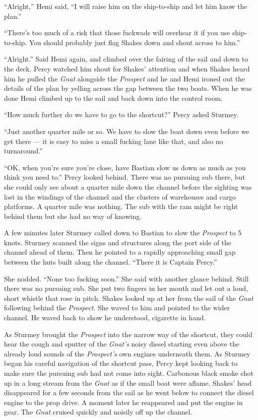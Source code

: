 \documentclass[]{scrbook}
\begin{document}
``Alright,'' Hemi said, ``I will raise him on the ship-to-ship and let
him know the plan.''

``There's too much of a risk that those fuckwads will overhear it if you
use ship-to-ship. You should probably just flag Shakes down and shout
across to him.''

``Alright.'' Said Hemi again, and climbed over the fairing of the sail
and down to the deck. Percy watched him shout for Shakes' attention and
when Shakes heard him he pulled the \emph{Gnat} alongside the
\emph{Prospect} and he and Hemi ironed out the details of the plan by
yelling across the gap between the two boats. When he was done Hemi
climbed up to the sail and back down into the control room.

``How much further do we have to go to the shortcut?'' Percy asked
Sturmey.

``Just another quarter mile or so. We have to slow the boat down even
before we get there --- it is easy to miss a small fucking lane like
that, and also no turnaround.''

``OK, when you're sure you're close, have Bastian slow us down as much
as you think you need to.'' Percy looked behind. There was no pursuing
sub there, but she could only see about a quarter mile down the channel
before the sighting was lost in the windings of the channel and the
clusters of warehouses and cargo platforms. A quarter mile was nothing.
The sub with the ram might be right behind them but she had no way of
knowing.

A few minutes later Sturmey called down to Bastian to slow the
\emph{Prospect} to 5 knots. Sturmey scanned the signs and structures
along the port side of the channel ahead of them. Then he pointed to a
rapidly approaching small gap between the huts built along the channel.
``There it is Captain Percy.''

She nodded. ``None too fucking soon.'' She said with another glance
behind. Still there was no pursuing sub. She put two fingers in her
mouth and let out a loud, short whistle that rose in pitch. Shakes
looked up at her from the sail of the \emph{Gnat} following behind the
\emph{Prospect}. She waved to him and pointed to the wider channel. He
waved back to show he understood, cigarette in hand.

As Sturmey brought the \emph{Prospect} into the narrow way of the
shortcut, they could hear the cough and sputter of the \emph{Gnat's}
noisy diesel starting even above the already loud sounds of the
\emph{Prospect's} own engines underneath them. As Sturmey began his
careful navigation of the shortcut pass, Percy kept looking back to make
sure the pursuing sub had not come into sight. Carbonous black smoke
shot up in a long stream from the \emph{Gnat} as if the small boat were
aflame. Shakes' head disappeared for a few seconds from the sail as he
went below to connect the diesel engine to the prop drive. A moment
later he reappeared and put the engine in gear. The \emph{Gnat} cruised
quickly and noisily off up the channel.
\end{document}
